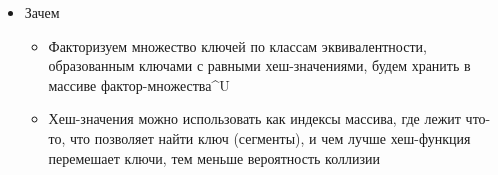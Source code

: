 \documentclass{../../slides-style}
\begin{document}
\begin{frame}
        \begin{itemize}
            \item Зачем
            \begin{itemize}
                \item Факторизуем множество ключей по классам эквивалентности, образованным ключами с равными хеш-значениями, будем хранить в массиве фактор-множества\^{}U
                \item Хеш-значения можно использовать как индексы массива, где лежит что-то, что позволяет найти ключ (сегменты), и чем лучше хеш-функция перемешает ключи, тем меньше вероятность коллизии
            \end{itemize}
        \end{itemize}
    \end{frame}
\end{document}
